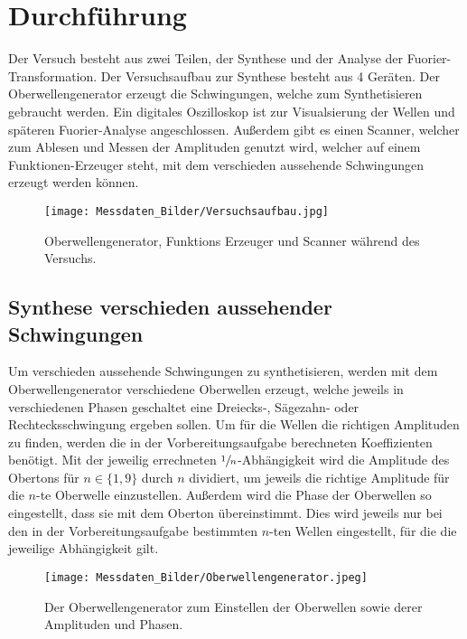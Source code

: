 \section{Durchführung}
\label{sec:Durchführung}
Der Versuch besteht aus zwei Teilen, der Synthese und der Analyse der Fuorier-Transformation.
Der Versuchsaufbau zur Synthese besteht aus 4 Geräten. Der Oberwellengenerator erzeugt die Schwingungen, welche zum 
Synthetisieren gebraucht werden. Ein digitales Oszilloskop ist zur Visualsierung der Wellen und späteren Fuorier-Analyse angeschlossen.
Außerdem gibt es einen Scanner, welcher zum Ablesen und Messen der Amplituden genutzt wird, welcher auf einem Funktionen-Erzeuger steht,
mit dem verschieden aussehende Schwingungen erzeugt werden können.
\begin{figure}
    \centering
    \texttt{[image: Messdaten\_Bilder/Versuchsaufbau.jpg]}
    \caption{Oberwellengenerator, Funktions Erzeuger und Scanner während des Versuchs.}
    \label{fig:Aufbau}
\end{figure}
\subsection{Synthese verschieden aussehender Schwingungen}
Um verschieden aussehende Schwingungen zu synthetisieren, werden mit dem Oberwellengenerator verschiedene Oberwellen erzeugt, welche jeweils in verschiedenen Phasen geschaltet 
eine Dreiecks-, Sägezahn- oder Rechtecksschwingung ergeben sollen. Um für die Wellen die richtigen Amplituden zu finden, werden die in der Vorbereitungsaufgabe berechneten 
Koeffizienten benötigt. Mit der jeweilig errechneten $\sfrac{1}{n}$-Abhängigkeit wird die Amplitude des Obertons für $n\in\{1,9\}$ durch $n$ dividiert, um 
jeweils die richtige Amplitude für die $n$-te Oberwelle einzustellen. Außerdem wird die Phase der Oberwellen so eingestellt, dass sie mit
dem Oberton übereinstimmt. Dies wird jeweils nur bei den in der Vorbereitungsaufgabe bestimmten $n$-ten 
Wellen eingestellt, für die die jeweilige Abhängigkeit gilt.
\begin{figure}[H]
    \centering
    \texttt{[image: Messdaten\_Bilder/Oberwellengenerator.jpeg]}
    \caption{Der Oberwellengenerator zum Einstellen der Oberwellen sowie derer Amplituden und Phasen.}
    \label{fig:Oberwelle}
\end{figure}
